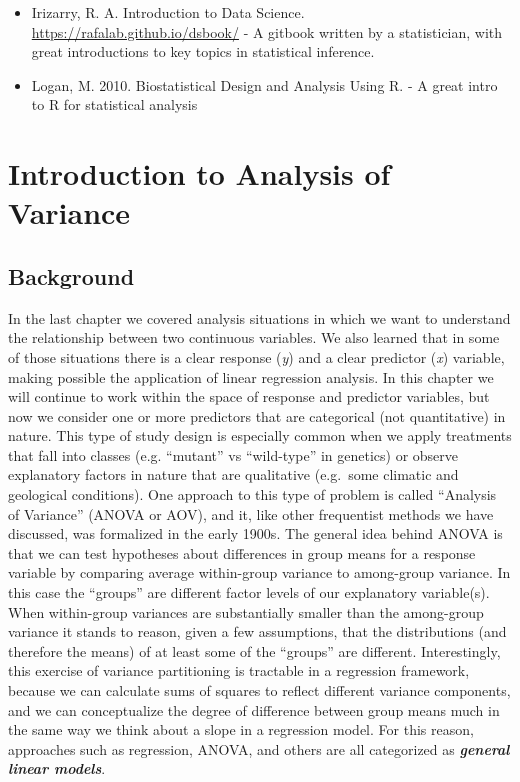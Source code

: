 \documentclass[]{book}
\begin{document}
\begin{itemize}
\item
  Irizarry, R. A. Introduction to Data Science. \url{https://rafalab.github.io/dsbook/} - A gitbook written by a statistician, with great introductions to key topics in statistical inference.
\item
  Logan, M. 2010. Biostatistical Design and Analysis Using R. - A great intro to R for statistical analysis
\end{itemize}

\hypertarget{introduction-to-analysis-of-variance}{%
\chapter{Introduction to Analysis of Variance}\label{introduction-to-analysis-of-variance}}

\hypertarget{background-7}{%
\section{Background}\label{background-7}}

In the last chapter we covered analysis situations in which we want to understand the relationship between two continuous variables. We also learned that in some of those situations there is a clear response (\emph{y}) and a clear predictor (\emph{x}) variable, making possible the application of linear regression analysis. In this chapter we will continue to work within the space of response and predictor variables, but now we consider one or more predictors that are categorical (not quantitative) in nature. This type of study design is especially common when we apply treatments that fall into classes (e.g. ``mutant'' vs ``wild-type'' in genetics) or observe explanatory factors in nature that are qualitative (e.g.~some climatic and geological conditions). One approach to this type of problem is called ``Analysis of Variance'' (ANOVA or AOV), and it, like other frequentist methods we have discussed, was formalized in the early 1900s. The general idea behind ANOVA is that we can test hypotheses about differences in group means for a response variable by comparing average within-group variance to among-group variance. In this case the ``groups'' are different factor levels of our explanatory variable(s). When within-group variances are substantially smaller than the among-group variance it stands to reason, given a few assumptions, that the distributions (and therefore the means) of at least some of the ``groups'' are different. Interestingly, this exercise of variance partitioning is tractable in a regression framework, because we can calculate sums of squares to reflect different variance components, and we can conceptualize the degree of difference between group means much in the same way we think about a slope in a regression model. For this reason, approaches such as regression, ANOVA, and others are all categorized as \textbf{\emph{general linear models}}.
\end{document}
